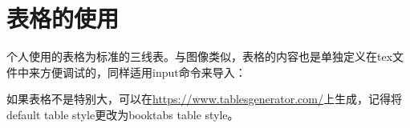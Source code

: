 \chapter{表格的使用}
\label{chap:table}
个人使用的表格为标准的三线表。与图像类似，表格的内容也是单独定义在tex文件中来方便调试的，同样适用input命令来导入：


如果表格不是特别大，可以在\href{https://www.tablesgenerator.com/}{https://www.tablesgenerator.com/}上生成，记得将default table style更改为booktabs table style。